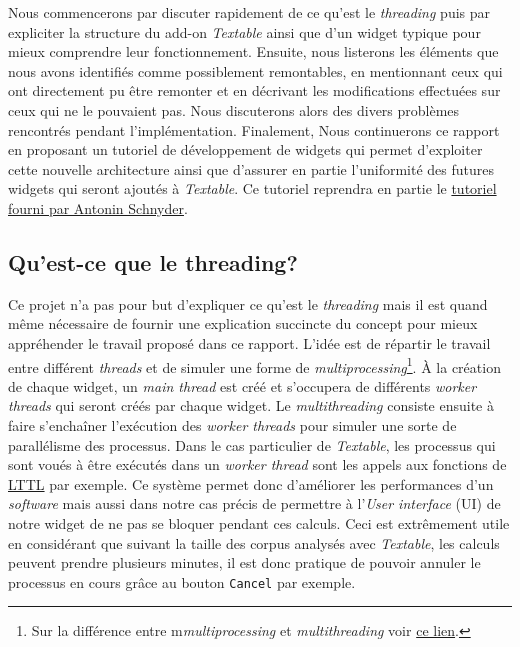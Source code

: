 \documentclass{article}
\begin{document}
Nous commencerons par discuter rapidement de ce qu'est le \textit{threading} puis par expliciter la structure du add-on \textit{Textable} ainsi que d'un widget typique pour mieux comprendre leur fonctionnement. Ensuite, nous listerons les éléments que nous avons identifiés comme possiblement remontables, en mentionnant ceux qui ont directement pu être remonter et en décrivant les modifications effectuées sur ceux qui ne le pouvaient pas. Nous discuterons alors des divers problèmes rencontrés pendant l'implémentation. Finalement, Nous continuerons ce rapport en proposant un tutoriel de développement de widgets qui permet d'exploiter cette nouvelle architecture ainsi que d'assurer en partie l'uniformité des futures widgets qui seront ajoutés à \textit{Textable}. Ce tutoriel reprendra en partie le \href{https://docs.google.com/document/d/1QtXm2aYMZXAyM7mfBTqxt_XrTNFqC7e3aqy7OC1A_18/edit}{tutoriel fourni par Antonin Schnyder}.

\subsection{Qu'est-ce que le threading?}

Ce projet n'a pas pour but d'expliquer ce qu'est le \textit{threading} mais il est quand même nécessaire de fournir une explication succincte du concept pour mieux appréhender le travail proposé dans ce rapport.
L'idée est de répartir le travail entre différent \textit{threads} et de simuler une forme de \textit{multiprocessing}\footnote{Sur la différence entre m\textit{multiprocessing} et \textit{multithreading} voir \href{https://www.geeksforgeeks.org/difference-between-multithreading-vs-multiprocessing-in-python/}{ce lien}.}. À la création de chaque widget, un \textit{main thread} est créé et s'occupera de différents \textit{worker threads} qui seront créés par chaque widget. Le \textit{multithreading} consiste ensuite à faire s'enchaîner l'exécution des \textit{worker threads} pour simuler une sorte de parallélisme des processus. Dans le cas particulier de \textit{Textable}, les processus qui sont voués à être exécutés dans un \textit{worker thread} sont les appels aux fonctions de \href{https://github.com/axanthos/LTTL}{LTTL} par exemple.
Ce système permet donc d'améliorer les performances d'un \textit{software} mais aussi dans notre cas précis de permettre à l'\textit{User interface} (UI) de notre widget de ne pas se bloquer pendant ces calculs. Ceci est extrêmement utile en considérant que suivant la taille des corpus analysés avec \textit{Textable}, les calculs peuvent prendre plusieurs minutes, il est donc pratique de pouvoir annuler le processus en cours grâce au bouton \texttt{Cancel} par exemple.
\end{document}
